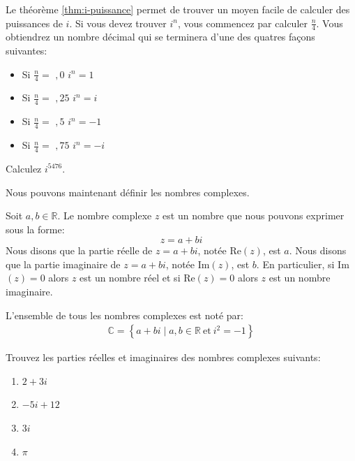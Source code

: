 \documentclass[]{book}
\providecommand{\tightlist}{%
  \setlength{\itemsep}{0pt}\setlength{\parskip}{0pt}}
\theoremstyle{definition}
\theoremstyle{definition}
\theoremstyle{definition}
\theoremstyle{remark}
\let\BeginKnitrBlock\begin \let\EndKnitrBlock\end
\begin{document}
\BeginKnitrBlock{remark}
{}Le théorème \ref{thm:i-puissance} permet de trouver un moyen facile de calculer des puissances de \(i\). Si vous devez trouver \(i^n\), vous commencez par calculer \(\frac{n}{4}\). Vous obtiendrez un nombre décimal qui se terminera d'une des quatres façons suivantes:

\begin{itemize}
\tightlist
\item
  Si \(\frac{n}{4}=\) \text{--} \(,0\)  \(i^n=1\)
\item
  Si \(\frac{n}{4}=\) \text{--} \(,25\)  \(i^n=i\)
\item
  Si \(\frac{n}{4}=\) \text{--} \(,5\)  \(i^n=-1\)
\item
  Si \(\frac{n}{4}=\) \text{--} \(,75\)  \(i^n=-i\)
\end{itemize}
\EndKnitrBlock{remark}

\BeginKnitrBlock{example}
\protect\hypertarget{exm:unnamed-chunk-143}{}{\label{exm:unnamed-chunk-143} }Calculez \(i^{5476}\).
\EndKnitrBlock{example}

Nous pouvons maintenant définir les nombres complexes.

\BeginKnitrBlock{definition}[Les nombres complexes]
\protect\hypertarget{def:unnamed-chunk-144}{}{\label{def:unnamed-chunk-144} {} }Soit \(a,b\in\mathbb{R}\). Le nombre complexe \(z\) est un nombre que nous pouvons exprimer sous la forme:
\[ z=a+bi \]
Nous disons que la partie réelle de \(z=a+bi\), notée Re\((z)\), est \(a\). Nous disons que la partie imaginaire de \(z=a+bi\), notée Im\((z)\), est \(b\). En particulier, si Im\((z)=0\) alors \(z\) est un nombre réel et si Re\((z)=0\) alors \(z\) est un nombre imaginaire.

L'ensemble de tous les nombres complexes est noté par:
\begin{align*}
\mathbb{C} = \left\{a+bi \mid a,b\in\mathbb{R} \ \text{et} \ i^2=-1\right\}
\end{align*}
\EndKnitrBlock{definition}

\BeginKnitrBlock{example}
\protect\hypertarget{exm:unnamed-chunk-145}{}{\label{exm:unnamed-chunk-145} }Trouvez les parties réelles et imaginaires des nombres complexes suivants:

\begin{enumerate}
\def\labelenumi{\alph{enumi}.}
\tightlist
\item
  \(2+3i\)
\item
  \(-5i+12\)
\item
  \(3i\)
\item
  \(\pi\)
\end{enumerate}
\EndKnitrBlock{example}
\end{document}
